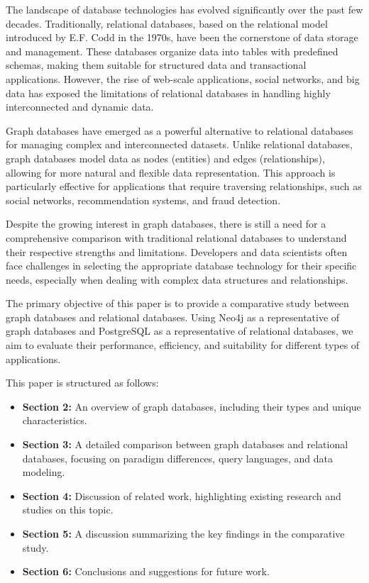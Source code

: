 The landscape of database technologies has evolved significantly over the past few decades. Traditionally, relational databases, based on the relational model introduced by E.F. Codd in the 1970s, have been the cornerstone of data storage and management. These databases organize data into tables with predefined schemas, making them suitable for structured data and transactional applications. However, the rise of web-scale applications, social networks, and big data has exposed the limitations of relational databases in handling highly interconnected and dynamic data.

Graph databases have emerged as a powerful alternative to relational databases for managing complex and interconnected datasets. Unlike relational databases, graph databases model data as nodes (entities) and edges (relationships), allowing for more natural and flexible data representation. This approach is particularly effective for applications that require traversing relationships, such as social networks, recommendation systems, and fraud detection.

Despite the growing interest in graph databases, there is still a need for a comprehensive comparison with traditional relational databases to understand their respective strengths and limitations. Developers and data scientists often face challenges in selecting the appropriate database technology for their specific needs, especially when dealing with complex data structures and relationships.

The primary objective of this paper is to provide a comparative study between graph databases and relational databases. Using Neo4j as a representative of graph databases and PostgreSQL as a representative of relational databases, we aim to evaluate their performance, efficiency, and suitability for different types of applications.


This paper is structured as follows:
\begin{itemize}
    \item \textbf{Section 2:} An overview of graph databases, including their types and unique characteristics.
    \item \textbf{Section 3:} A detailed comparison between graph databases and relational databases, focusing on paradigm differences, query languages, and data modeling.
    \item \textbf{Section 4:} Discussion of related work, highlighting existing research and studies on this topic.
    \item \textbf{Section 5:} A discussion summarizing the key findings in the comparative study.
    \item \textbf{Section 6:} Conclusions and suggestions for future work.
\end{itemize}
